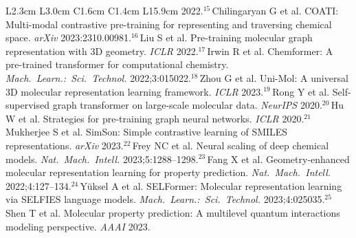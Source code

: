 \documentclass[11pt,a4paper]{article}
\begin{document}
\begin{longtable}{%
    L{2.3cm}   %
    L{3.0cm}   %
    C{1.6cm}   %
    C{1.4cm}   %
    L{15.9cm}  %
  }
{2022.\newline $^{15}$\,Chilingaryan G et al. COATI: Multi-modal contrastive pre-training for representing and traversing chemical space. \textit{arXiv} 2023:2310.00981.\newline $^{16}$\,Liu S et al. Pre-training molecular graph representation with 3D geometry. \textit{ICLR} 2022.\newline $^{17}$\,Irwin R et al. Chemformer: A pre-trained transformer for computational chemistry. \textit{Mach.~Learn.:~Sci.~Technol.} 2022;3:015022.\newline $^{18}$\,Zhou G et al. Uni-Mol: A universal 3D molecular representation learning framework. \textit{ICLR} 2023.\newline $^{19}$\,Rong Y et al. Self-supervised graph transformer on large-scale molecular data. \textit{NeurIPS} 2020.\newline $^{20}$\,Hu W et al. Strategies for pre-training graph neural networks. \textit{ICLR} 2020.\newline $^{21}$\,Mukherjee S et al. SimSon: Simple contrastive learning of SMILES representations. \textit{arXiv} 2023.\newline $^{22}$\,Frey NC et al. Neural scaling of deep chemical models. \textit{Nat.~Mach.~Intell.} 2023;5:1288--1298.\newline $^{23}$\,Fang X et al. Geometry-enhanced molecular representation learning for property prediction. \textit{Nat.~Mach.~Intell.} 2022;4:127--134.\newline $^{24}$\,Y\"{u}ksel A et al. SELFormer: Molecular representation learning via SELFIES language models. \textit{Mach.~Learn.:~Sci.~Technol.} 2023;4:025035.\newline $^{25}$\,Shen T et al. Molecular property prediction: A multilevel quantum interactions modeling perspective. \textit{AAAI} 2023.
}\tabularnewline
\endlastfoot


\end{longtable}
\end{document}
